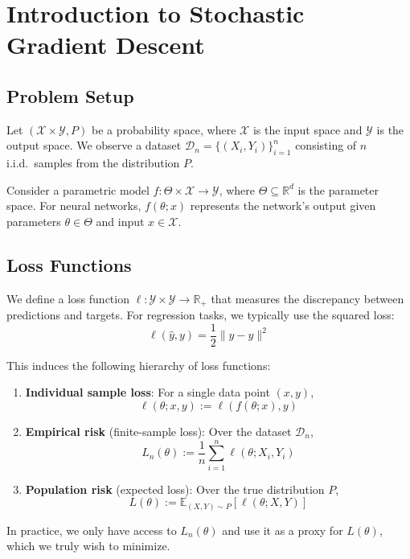 \documentclass[11pt]{article}
\begin{document}
\section{Introduction to Stochastic Gradient Descent}

\subsection{Problem Setup}

Let $(\mathcal{X} \times \mathcal{Y}, P)$ be a probability space, where $\mathcal{X}$ is the input space and $\mathcal{Y}$ is the output space. We observe a dataset $\mathcal{D}_n = \{(X_i, Y_i)\}_{i=1}^n$ consisting of $n$ i.i.d.\ samples from the distribution $P$.

Consider a parametric model $f: \Theta \times \mathcal{X} \to \mathcal{Y}$, where $\Theta \subseteq \mathbb{R}^d$ is the parameter space. For neural networks, $f(\theta; x)$ represents the network's output given parameters $\theta \in \Theta$ and input $x \in \mathcal{X}$.

\subsection{Loss Functions}

We define a loss function $\ell: \mathcal{Y} \times \mathcal{Y} \to \mathbb{R}_+$ that measures the discrepancy between predictions and targets. For regression tasks, we typically use the squared loss:
$$\ell(\hat{y}, y) = \frac{1}{2}\|\hat{y} - y\|^2$$

This induces the following hierarchy of loss functions:

\begin{enumerate}
    \item \textbf{Individual sample loss}: For a single data point $(x, y)$,
    $$\ell(\theta; x, y) := \ell(f(\theta; x), y)$$
    
    \item \textbf{Empirical risk} (finite-sample loss): Over the dataset $\mathcal{D}_n$,
    $$L_n(\theta) := \frac{1}{n} \sum_{i=1}^n \ell(\theta; X_i, Y_i)$$
    
    \item \textbf{Population risk} (expected loss): Over the true distribution $P$,
    $$L(\theta) := \mathbb{E}_{(X,Y) \sim P}[\ell(\theta; X, Y)]$$
\end{enumerate}

In practice, we only have access to $L_n(\theta)$ and use it as a proxy for $L(\theta)$, which we truly wish to minimize.
\end{document}
